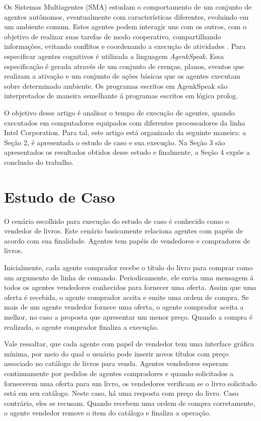 \documentclass[conference]{IEEEtran}
\begin{document}
        Os Sistemas Multiagentes (SMA) estudam o comportamento de um conjunto de agentes autônomos, eventualmente com características diferentes, evoluindo em um ambiente comum. Estes agentes podem interagir uns com os outros, com o objetivo de realizar suas tarefas de modo cooperativo, compartilhando informações, evitando conflitos e coordenando a execução de atividades \cite{alvares1997introduccao}.
        Para especificar agentes cognitivos é utilizada a linguagem \textit{AgenkSpeak}. Essa especificação é gerada através de um conjunto de crenças, planos, eventos que realizam a ativação e um conjunto de ações básicas que os agentes executam sobre determinado ambiente. Os programas escritos em AgenkSpeak  são interpretados de maneira semelhante á programas escritos em lógica prolog.      
        
    O objetivo desse artigo é analisar o tempo de execução de agentes, quando executados em computadores equipados com diferentes processadores da linha Intel Corporation. Para tal, este artigo está organizado da seguinte maneira: a Seção 2, é apresentada o estudo de caso e sua execução. Na Seção 3 são apresentados os resultados obtidos desse estudo e finalmente, a Seção 4 expõe a conclusão do trabalho.
      

    \section{Estudo de Caso}
    
    O cenário escolhido para execução do estudo de caso é conhecido como o vendedor de livros. Este cenário basicamente relaciona agentes com papéis de acordo com sua finalidade.  Agentes tem papéis de vendedores e compradores de livros. 
        
    Inicialmente, cada agente comprador recebe o título do livro para comprar como um argumento de linha de comando. Periodicamente, ele envia uma mensagem á todos os agentes vendedores conhecidos para fornecer uma oferta. Assim que uma oferta é recebida, o agente comprador aceita e emite uma ordem de compra. Se mais de um agente vendedor fornece uma oferta, o agente comprador aceita a melhor, no caso a proposta que apresentar um menor preço. Quando a compra é realizada, o agente comprador finaliza a execução.
        
    Vale ressaltar, que cada agente com papel de vendedor tem uma interface gráfica mínima, por meio do qual o usuário pode inserir novos títulos com preço associado no catálogo de livros para venda. Agentes vendedores esperam continuamente por pedidos de agentes compradores e quando solicitados a fornecerem uma oferta para um livro, os vendedores verificam se o livro solicitado está em seu catálogo. Neste caso, há uma resposta com preço do livro. Caso contrário, eles se recusam. Quando recebem uma ordem de compra corretamente, o agente vendedor remove o item do catálogo e finaliza a operação.
    
\end{document}
